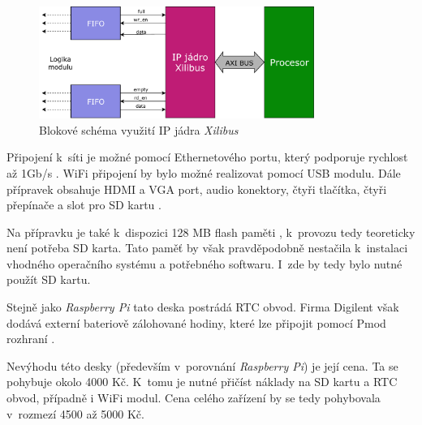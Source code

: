 \begin{figure}[h!]
    \centering
    \includegraphics[width=0.8\textwidth]{images/xilibus.pdf}
    \caption[Blokové schéma využití IP jádra \textit{Xilibus}]{Blokové schéma využití IP jádra \textit{Xilibus} \cite{xilibus}}
    \label{fig:xilibus}
\end{figure}

Připojení k~síti je možné pomocí Ethernetového portu, který podporuje rychlost až 1Gb/s \cite{zybo_man}. WiFi připojení by bylo možné realizovat pomocí USB modulu. Dále přípravek obsahuje HDMI a VGA port, audio konektory, čtyři tlačítka, čtyři přepínače a slot pro SD kartu \cite{zybo_man}.

Na přípravku je také k~dispozici 128 MB flash paměti \cite{zybo_man}, k~provozu tedy teoreticky není potřeba SD karta. Tato paměť by však pravděpodobně nestačila k~instalaci vhodného operačního systému a potřebného softwaru. I~zde by tedy bylo nutné použít SD kartu.

Stejně jako \textit{Raspberry Pi} tato deska postrádá RTC obvod. Firma Digilent však dodává externí bateriově zálohované hodiny, které lze připojit pomocí Pmod rozhraní \cite{pmod_rtc_man}. 

Nevýhodu této desky (především v~porovnání \textit{Raspberry Pi}) je její cena. Ta se pohybuje okolo 4000 Kč. K~tomu je nutné přičíst náklady na SD kartu a RTC obvod, případně i WiFi modul. Cena celého zařízení by se tedy pohybovala v~rozmezí 4500 až 5000 Kč.




\newpage

